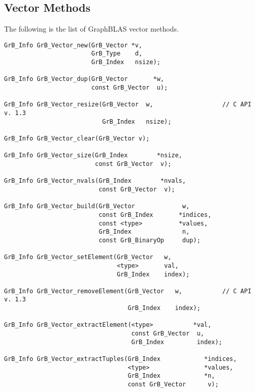 \documentclass[11pt]{article}
\begin{document}
                
\subsection{Vector Methods}

The following is the list of GraphBLAS vector methods.

\begin{verbatim}
GrB_Info GrB_Vector_new(GrB_Vector *v,
                        GrB_Type    d,
                        GrB_Index   nsize);
                        
GrB_Info GrB_Vector_dup(GrB_Vector       *w,
                        const GrB_Vector  u);

GrB_Info GrB_Vector_resize(GrB_Vector  w,                   // C API v. 1.3
                           GrB_Index   nsize);                        

GrB_Info GrB_Vector_clear(GrB_Vector v);

GrB_Info GrB_Vector_size(GrB_Index        *nsize,
                         const GrB_Vector  v);

GrB_Info GrB_Vector_nvals(GrB_Index        *nvals,
                          const GrB_Vector  v);

GrB_Info GrB_Vector_build(GrB_Vector             w,
                          const GrB_Index       *indices,
                          const <type>          *values,
                          GrB_Index              n,
                          const GrB_BinaryOp     dup);
                          
GrB_Info GrB_Vector_setElement(GrB_Vector   w,
                               <type>       val,
                               GrB_Index    index);

GrB_Info GrB_Vector_removeElement(GrB_Vector   w,           // C API v. 1.3
                                  GrB_Index    index);

GrB_Info GrB_Vector_extractElement(<type>           *val,
                                   const GrB_Vector  u,
                                   GrB_Index         index);

GrB_Info GrB_Vector_extractTuples(GrB_Index            *indices,
                                  <type>               *values,
                                  GrB_Index            *n, 
                                  const GrB_Vector      v);
\end{verbatim}
                       
\end{document}
